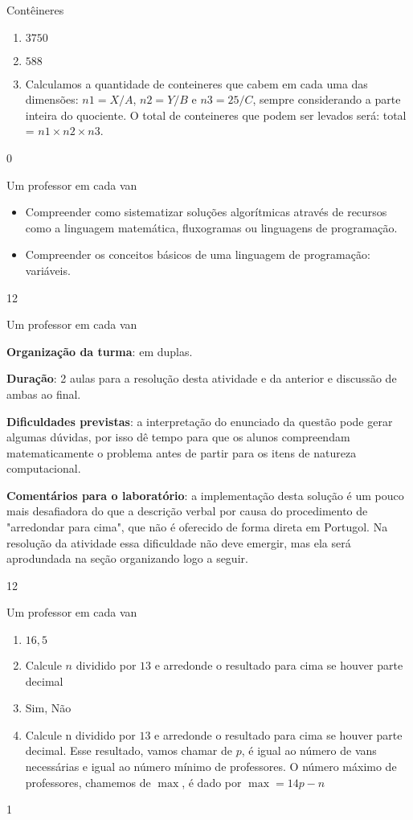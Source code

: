 \begin{answer}{Contêineres}
{
\begin{enumerate}
\item $3750$

\item $588$

\item Calculamos a quantidade de conteineres que cabem em cada uma das dimensões: $n1=X/ A$, $n2=Y\slash B$ e $n3=25\slash C$, sempre considerando a parte inteira do quociente. O total de conteineres que podem ser levados será: total = $n1\times n2\times n3$.
\end{enumerate}
}{0}
\end{answer}
\begin{objectives}{Um professor em cada van}
{
\begin{itemize}
\item Compreender como sistematizar soluções algorítmicas através de recursos como a linguagem matemática, fluxogramas ou linguagens de programação.

\item Compreender os conceitos básicos de uma linguagem de programação: variáveis.
\end{itemize}
}{1}{2}
\end{objectives}
\begin{sugestions}{Um professor em cada van}
{
\textbf{Organização da turma}: em duplas.

\textbf{Duração}: 2 aulas para a resolução desta atividade e da anterior e discussão de ambas ao final.

\textbf{Dificuldades previstas}: a interpretação do enunciado da questão pode gerar algumas dúvidas, por isso dê tempo para que os alunos compreendam matematicamente o problema antes de partir para os itens de natureza computacional.

\textbf{Comentários para o laboratório}: a implementação desta solução é um pouco mais desafiadora do que a descrição verbal por causa do procedimento de "arredondar para cima", que não é oferecido de forma direta em Portugol. Na resolução da atividade essa dificuldade não deve emergir, mas ela será aprodundada na seção organizando logo a seguir.
}{1}{2}
\end{sugestions}
\begin{answer}{Um professor em cada van}
{
\begin{enumerate}
\item $16{,}5$

\item Calcule $n$ dividido por $13$ e arredonde o resultado para cima se houver parte decimal

\item Sim, Não

\item Calcule n dividido por $13$ e arredonde o resultado para cima se houver parte decimal. Esse resultado, vamos chamar de $p$, é igual ao número de vans necessárias e igual ao número mínimo de professores. O número máximo de professores, chamemos de $\max$, é dado por $\max=14p-n$
\end{enumerate}
}{1}
\end{answer}


